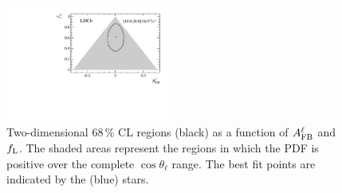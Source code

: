 \begin{figure}[h]
\includegraphics[width=0.48\textwidth]{Lmumu/figs/paper/figure10e.pdf}
\caption{Two-dimensional 68\,\% CL regions (black) as a
  function of $A_{\rm FB}^\ell$ and $f_{\rm L}$.  The shaded areas
  represent the regions in which the PDF is positive over the complete $\cos
  \theta_{\ell}$ range. The best fit points are indicated by the (blue) stars. }
\label{fig:contours}
\end{figure}
